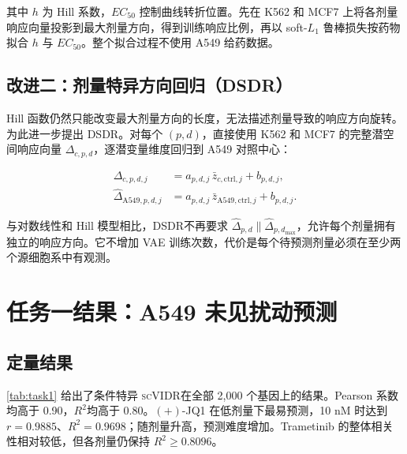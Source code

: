 \documentclass[UTF8,11pt,a4paper,fontset=fandol]{ctexart}
\newcommand{\scvidr}{\textsc{scVIDR}}
\newcommand{\dsdr}{\textsc{DSDR}}
\newcommand{\Rtwo}{\ensuremath{R^2}}
\begin{document}
其中 $h$ 为 Hill 系数，$EC_{50}$ 控制曲线转折位置。先在 K562 和 MCF7 上将各剂量响应向量投影到最大剂量方向，得到训练响应比例，再以 soft-$L_1$ 鲁棒损失按药物拟合 $h$ 与 $EC_{50}$。整个拟合过程不使用 A549 给药数据。

\subsection{改进二：剂量特异方向回归（DSDR）}

Hill 函数仍然只能改变最大剂量方向的长度，无法描述剂量导致的响应方向旋转。为此进一步提出 \dsdr。对每个 $(p,d)$，直接使用 K562 和 MCF7 的完整潜空间响应向量 $\Delta_{c,p,d}$，逐潜变量维度回归到 A549 对照中心：

\begin{align}
\Delta_{c,p,d,j} &= a_{p,d,j}\,\bar z_{c,\mathrm{ctrl},j}+b_{p,d,j},\\
\widehat{\Delta}_{\mathrm{A549},p,d,j}
&=a_{p,d,j}\,\bar z_{\mathrm{A549,ctrl},j}+b_{p,d,j}.
\end{align}

与对数线性和 Hill 模型相比，\dsdr 不再要求
$\widehat{\Delta}_{p,d}\parallel\widehat{\Delta}_{p,d_{\max}}$，允许每个剂量拥有独立的响应方向。它不增加 VAE 训练次数，代价是每个待预测剂量必须在至少两个源细胞系中有观测。

\section{任务一结果：A549 未见扰动预测}

\subsection{定量结果}

\cref{tab:task1} 给出了条件特异 \scvidr 在全部 2,000 个基因上的结果。Pearson 系数均高于 0.90，\Rtwo 均高于 0.80。$(+)$-JQ1 在低剂量下最易预测，10 nM 时达到 $r=0.9885$、$R^2=0.9698$；随剂量升高，预测难度增加。Trametinib 的整体相关性相对较低，但各剂量仍保持 $R^2\geq0.8096$。
\end{document}
